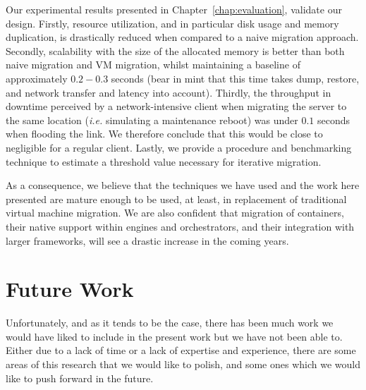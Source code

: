 Our experimental results presented in Chapter~\ref{chap:evaluation}, validate our design.
Firstly, resource utilization, and in particular disk usage and memory duplication, is drastically reduced when compared to a naive migration approach.
Secondly, scalability with the size of the allocated memory is better than both naive migration and VM migration, whilst maintaining a baseline of approximately $0.2-0.3$ seconds (bear in mint that this time takes dump, restore, and network transfer and latency into account).
Thirdly, the throughput in downtime perceived by a network-intensive client when migrating the server to the same location (\textit{i.e.} simulating a maintenance reboot) was under $0.1$ seconds when flooding the link.
We therefore conclude that this would be close to negligible for a regular client.
Lastly, we provide a procedure and benchmarking technique to estimate a threshold value necessary for iterative migration.

As a consequence, we believe that the techniques we have used and the work here presented are mature enough to be used, at least, in replacement of traditional virtual machine migration.
We are also confident that migration of containers, their native support within engines and orchestrators, and their integration with larger frameworks, will see a drastic increase in the coming years.

\section{Future Work} \label{sec:conc-fw}

Unfortunately, and as it tends to be the case, there has been much work we would have liked to include in the present work but we have not been able to.
Either due to a lack of time or a lack of expertise and experience, there are some areas of this research that we would like to polish, and some ones which we would like to push forward in the future.

